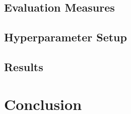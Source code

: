 \documentclass{article}
\begin{document}
\subsection{Evaluation Measures}

\subsection{Hyperparameter Setup}
\subsection{Results}

\section{Conclusion}



\end{document}
